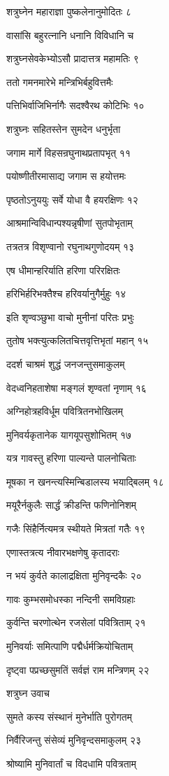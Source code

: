 शत्रुघ्नेन महाराज्ञा पुष्कलेनानुमोदितः ८

वासांसि बहुरत्नानि धनानि विविधानि च

शत्रुघ्नसेवकेभ्योऽसौ प्रादात्तत्र महामतिः ९

ततो गमनमारेभे मन्त्रिभिर्बहुवित्तमैः

पत्तिभिर्वाजिभिर्नागैः सदश्वैरथ कोटिभिः १०

शत्रुघ्नः सहितस्तेन सुमदेन धनुर्भृता

जगाम मार्गे विहसन्रघुनाथप्रतापभृत् ११

पयोष्णीतीरमासाद्य जगाम स हयोत्तमः

पृष्ठतोऽनुययुः सर्वे योधा वै हयरक्षिणः १२

आश्रमान्विविधान्पश्यन्नृषीणां सुतपोभृताम्

तत्रतत्र विशृण्वानो रघुनाथगुणोदयम् १३

एष धीमान्हरिर्याति हरिणा परिरक्षितः

हरिभिर्हरिभक्तैश्च हरिवर्यानुगैर्मुहुः १४

इति शृण्वञ्छुभा वाचो मुनीनां परितः प्रभुः

तुतोष भक्त्युत्कलितचित्तवृत्तिभृतां महान् १५

ददर्श चाश्रमं शुद्धं जनजन्तुसमाकुलम्

वेदध्वनिहताशेषा मङ्गलं शृण्वतां नृणाम् १६

अग्निहोत्रहविर्धूम पवित्रितनभोखिलम्

मुनिवर्यकृतानेक यागयूपसुशोभितम् १७

यत्र गावस्तु हरिणा पाल्यन्ते पालनोचिताः

मूषका न खनन्त्यस्मिन्बिडालस्य भयाद्बिलम् १८

मयूरैर्नकुलैः सार्द्धं क्रीडन्ति फणिनोनिशम्

गजैः सिंहैर्नित्यमत्र स्थीयते मित्रतां गतैः १९

एणास्तत्रत्य नीवारभक्षणेषु कृतादराः

न भयं कुर्वते कालाद्रक्षिता मुनिवृन्दकैः २०

गावः कुम्भसमोधस्का नन्दिनी समविग्रहाः

कुर्वन्ति चरणोत्थेन रजसेलां पवित्रिताम् २१

मुनिवर्याः समित्पाणि पद्मैर्धर्मक्रियोचिताम्

दृष्ट्वा पप्रच्छसुमतिं सर्वज्ञं राम मन्त्रिणम् २२

शत्रुघ्न उवाच

सुमते कस्य संस्थानं मुनेर्भाति पुरोगतम्

निर्वैरिजन्तु संसेव्यं मुनिवृन्दसमाकुलम् २३

श्रोष्यामि मुनिवार्तां च विदधामि पवित्रताम्


